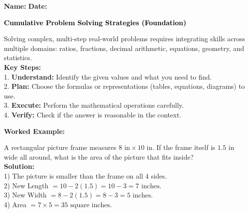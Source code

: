 \documentclass[12pt, letterpaper, fleqn]{article}
\begin{document}
\textbf{Name:} \underline{\hspace{5cm}}
\hfill
\textbf{Date:} \underline{\hspace{3cm}}\\

\begin{tcolorbox}[colback=black!10]
    \large\textcolor{black}{\textbf{Cumulative Problem Solving Strategies (Foundation)}}
\end{tcolorbox}

\vspace{3mm}

\noindent
Solving complex, multi-step real-world problems requires integrating skills across multiple domains: ratios, fractions, decimal arithmetic, equations, geometry, and statistics. \\
\textbf{Key Steps:} \\
1. \textbf{Understand:} Identify the given values and what you need to find. \\
2. \textbf{Plan:} Choose the formulas or representations (tables, equations, diagrams) to use. \\
3. \textbf{Execute:} Perform the mathematical operations carefully. \\
4. \textbf{Verify:} Check if the answer is reasonable in the context.

\vspace{4mm}

\begin{tcolorbox}[colback=white, colframe=black!25, boxrule=0.6pt, arc=4mm, left=6mm, right=6mm, top=5mm, bottom=5mm]
\textbf{Worked Example:}

\medskip
\noindent
A rectangular picture frame measures $8\text{ in} \times 10\text{ in}$. If the frame itself is $1.5\text{ in}$ wide all around, what is the area of the picture that fits inside?\\
\textbf{Solution:}\\
1) The picture is smaller than the frame on all 4 sides. \\
2) New Length $= 10 - 2(1.5) = 10 - 3 = 7\text{ inches}$. \\
3) New Width $= 8 - 2(1.5) = 8 - 3 = 5\text{ inches}$. \\
4) Area $= 7 \times 5 = 35\text{ square inches}$.
\end{tcolorbox}
\end{document}
